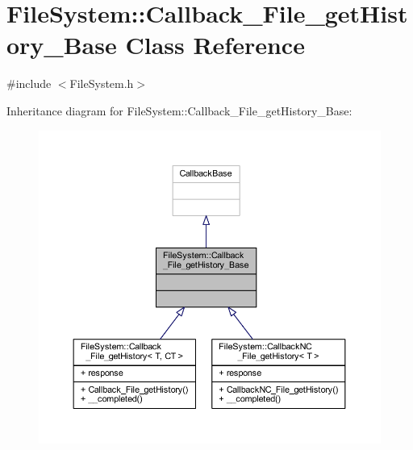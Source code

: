 \hypertarget{class_file_system_1_1_callback___file__get_history___base}{}\section{File\+System\+:\+:Callback\+\_\+\+File\+\_\+get\+History\+\_\+\+Base Class Reference}
\label{class_file_system_1_1_callback___file__get_history___base}


{\ttfamily \#include $<$File\+System.\+h$>$}



Inheritance diagram for File\+System\+:\+:Callback\+\_\+\+File\+\_\+get\+History\+\_\+\+Base\+:
\nopagebreak
\begin{figure}[H]
\begin{center}
\leavevmode
\includegraphics[width=350pt]{class_file_system_1_1_callback___file__get_history___base__inherit__graph}
\end{center}
\end{figure}


